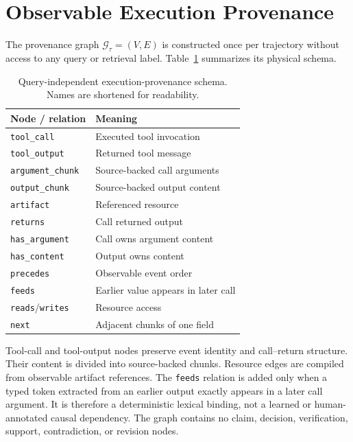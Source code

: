 \documentclass[sigconf,anonymous,review]{acmart}
\begin{document}
\section{Observable Execution Provenance}
\label{sec:graph}

The provenance graph $\mathcal{G}_\tau=(V,E)$ is constructed once per trajectory without access to any query or retrieval label. Table~\ref{tab:schema} summarizes its physical schema.

\begin{table}[t]
\centering
\small
\begin{tabular}{ll}
\hline
Node / relation & Meaning \\
\hline
\texttt{tool\_call} & Executed tool invocation \\
\texttt{tool\_output} & Returned tool message \\
\texttt{argument\_chunk} & Source-backed call arguments \\
\texttt{output\_chunk} & Source-backed output content \\
\texttt{artifact} & Referenced resource \\
\hline
\texttt{returns} & Call returned output \\
\texttt{has\_argument} & Call owns argument content \\
\texttt{has\_content} & Output owns content \\
\texttt{precedes} & Observable event order \\
\texttt{feeds} & Earlier value appears in later call \\
\texttt{reads}/\texttt{writes} & Resource access \\
\texttt{next} & Adjacent chunks of one field \\
\hline
\end{tabular}
\caption{Query-independent execution-provenance schema. Names are shortened for readability.}
\label{tab:schema}
\end{table}

Tool-call and tool-output nodes preserve event identity and call--return structure. Their content is divided into source-backed chunks. Resource edges are compiled from observable artifact references. The \texttt{feeds} relation is added only when a typed token extracted from an earlier output exactly appears in a later call argument. It is therefore a deterministic lexical binding, not a learned or human-annotated causal dependency. The graph contains no claim, decision, verification, support, contradiction, or revision nodes.
\end{document}
